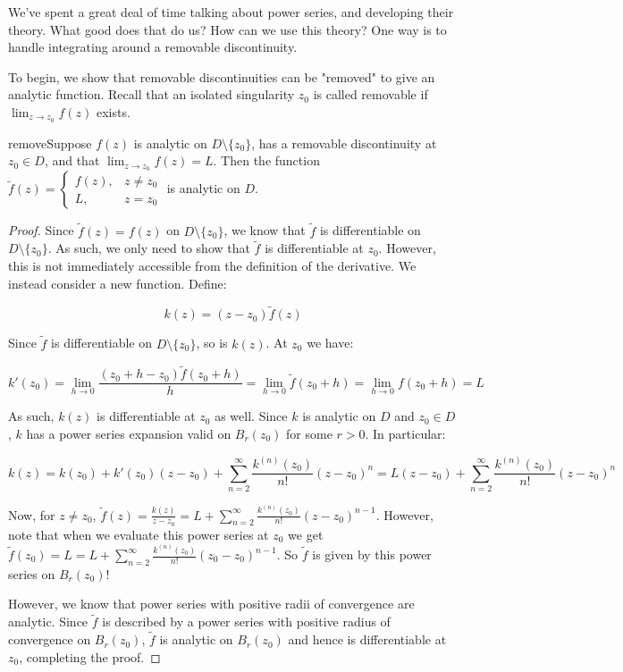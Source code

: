 We've spent a great deal of time talking about power series, and developing their theory. What good does that do us? How can we use this theory? One way is to handle integrating around a removable discontinuity.

To begin, we show that removable discontinuities can be "removed" to give an analytic function. Recall that an isolated singularity $z_0$ is called removable if $\lim_{z\rightarrow z_0} f(z)$ exists.

\begin{thmbo}{}{remove}Suppose $f(z)$ is analytic on $D\setminus \{z_0\}$, has a removable discontinuity at $z_0\in D$, and that $\lim_{z\rightarrow z_0} f(z) = L$. Then the function $\tilde{f}(z) = \begin{cases} f(z), & z\ne z_0\\ L, & z= z_0\end{cases}$ is analytic on $D$.
\end{thmbo}

\begin{proof} Since $\tilde{f}(z) = f(z)$ on $D\setminus\{z_0\}$, we know that $\tilde{f}$ is differentiable on $D\setminus\{z_0\}$. As such, we only need to show that $\tilde{f}$ is differentiable at $z_0$. However, this is not immediately accessible from the definition of the derivative. We instead consider a new function. Define:

$$k(z) = (z-z_0)\tilde{f}(z)$$

Since $\tilde{f}$ is differentiable on $D\setminus\{z_0\}$, so is $k(z)$. At $z_0$ we have:

$$k'(z_0) = \lim_{h\rightarrow 0} \frac{(z_0 + h - z_0)\tilde{f}(z_0 + h)}{h}= \lim_{h\rightarrow 0}\tilde{f}(z_0 + h) = \lim_{h\rightarrow 0}f(z_0 + h) = L$$

As such, $k(z)$ is differentiable at $z_0$ as well. Since $k$ is analytic on $D$ and $z_0\in D$, $k$ has a power series expansion valid on $B_r(z_0)$ for some $r > 0$. In particular:

$$k(z) = k(z_0) + k'(z_0)(z-z_0) + \sum_{n = 2}^\infty \frac{k^{(n)}(z_0)}{n!}(z-z_0)^n = L(z-z_0) + \sum_{n = 2}^\infty \frac{k^{(n)}(z_0)}{n!}(z-z_0)^n$$

Now, for $z\ne z_0$, $\tilde{f}(z) = \frac{k(z)}{z-z_0} = L + \sum_{n = 2}^\infty \frac{k^{(n)}(z_0)}{n!}(z-z_0)^{n-1}$. However, note that when we evaluate this power series at $z_0$ we get $\tilde{f}(z_0) = L = L + \sum_{n = 2}^\infty \frac{k^{(n)}(z_0)}{n!}(z_0-z_0)^{n-1}$. So $\tilde{f}$ is given by this power series on $B_r(z_0)$!

However, we know that power series with positive radii of convergence are analytic. Since $\tilde{f}$ is described by a power series with positive radius of convergence on $B_r(z_0)$, $\tilde{f}$ is analytic on $B_r(z_0)$ and hence is differentiable at $z_0$, completing the proof.
\end{proof}

